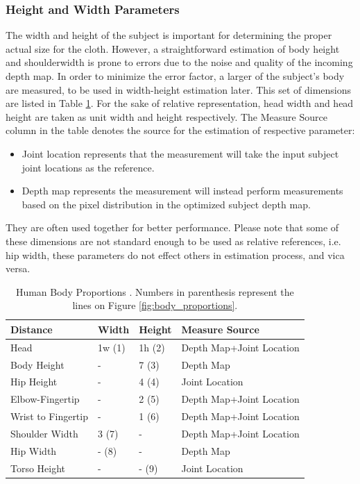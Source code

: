 \documentclass[twocolumn]{svjour3}          %
\begin{document}
\subsubsection{Height and Width Parameters}

The width and height of the subject is important for determining the proper actual size for the cloth. However, a straightforward estimation of body height and shoulderwidth is prone to errors due to the noise and quality of the incoming depth map. In order to minimize the error factor, a larger of the subject's body are measured, to be used in width-height estimation later. This set of dimensions are listed in Table \ref{tbl:human_body_proportions}. 
For the sake of relative representation, head width and head height are taken as unit width and height respectively. The Measure Source column in the table denotes the source for the estimation of respective parameter:
\begin{itemize} 
\item
Joint location represents that the measurement will take the input subject joint locations as the reference.
\item 
Depth map represents the measurement will instead perform measurements based on the pixel distribution in the optimized subject depth map. 
\end{itemize}
They are often used together for better performance. Please note that some of these dimensions are not standard enough to be used as relative references, i.e. hip width, these parameters do not effect others in estimation process, and vica versa.

\begin{table}

\begin{tabularx}{\columnwidth}{ | p{} |  p{} | p{} |  p{} |}
\hline
\textbf{Distance} & \textbf{Width} & \textbf{Height} & \textbf{Measure Source} \\ \hline
Head & 1w (1) & 1h (2) & Depth Map+Joint Location \\ \hline
Body Height & - & 7 (3) & Depth Map \\ \hline
Hip Height & - & 4 (4) & Joint Location \\ \hline
Elbow-Fingertip & - & 2 (5) & Depth Map+Joint Location \\ \hline
Wrist to Fingertip & - & 1 (6) & Depth Map+Joint Location \\ \hline
Shoulder Width & 3 (7) & - & Depth Map+Joint Location \\ \hline
Hip Width & - (8) & - & Depth Map \\ \hline
Torso Height & - & - (9) & Joint Location \\ 
\hline
\end{tabularx}
\caption{Human Body Proportions \cite{Willis2012}. Numbers in parenthesis represent the lines on Figure \ref{fig:body_proportions}.}
\label{tbl:human_body_proportions}
\end{table}
\end{document}
